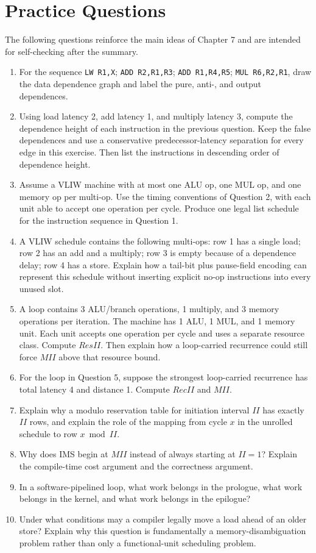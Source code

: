 \section{Practice Questions}\label{sec:ch7-practice}
The following questions reinforce the main ideas of Chapter 7 and are intended for self-checking after the summary.
\begin{enumerate}
    \item For the sequence \texttt{LW R1,X}; \texttt{ADD R2,R1,R3}; \texttt{ADD R1,R4,R5}; \texttt{MUL R6,R2,R1}, draw the data dependence graph and label the pure, anti-, and output dependences.
    \item Using load latency 2, add latency 1, and multiply latency 3, compute the dependence height of each instruction in the previous question.
    Keep the false dependences and use a conservative predecessor-latency separation for every edge in this exercise.
    Then list the instructions in descending order of dependence height.
    \item Assume a VLIW machine with at most one ALU op, one MUL op, and one memory op per multi-op.
    Use the timing conventions of Question 2, with each unit able to accept one operation per cycle.
    Produce one legal list schedule for the instruction sequence in Question 1.
    \item A VLIW schedule contains the following multi-ops: row 1 has a single load; row 2 has an add and a multiply; row 3 is empty because of a dependence delay; row 4 has a store.
    Explain how a tail-bit plus pause-field encoding can represent this schedule without inserting explicit no-op instructions into every unused slot.
    \item A loop contains 3 ALU/branch operations, 1 multiply, and 3 memory operations per iteration.
    The machine has 1 ALU, 1 MUL, and 1 memory unit.
    Each unit accepts one operation per cycle and uses a separate resource class.
    Compute $ResII$.
    Then explain how a loop-carried recurrence could still force $MII$ above that resource bound.
    \item For the loop in Question 5, suppose the strongest loop-carried recurrence has total latency 4 and distance 1.
    Compute $RecII$ and $MII$.
    \item Explain why a modulo reservation table for initiation interval $II$ has exactly $II$ rows, and explain the role of the mapping from cycle $x$ in the unrolled schedule to row $x \bmod II$.
    \item Why does IMS begin at $MII$ instead of always starting at $II=1$? Explain the compile-time cost argument and the correctness argument.
    \item In a software-pipelined loop, what work belongs in the prologue, what work belongs in the kernel, and what work belongs in the epilogue?
    \item Under what conditions may a compiler legally move a load ahead of an older store?
    Explain why this question is fundamentally a memory-disambiguation problem rather than only a functional-unit scheduling problem.
\end{enumerate}
